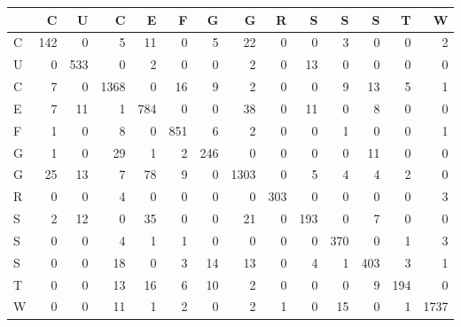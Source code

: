 \begin{tabular}{lrrrrrrrrrrrrr}
\toprule
{} &    C &    U &     C &    E &    F &    G &     G &    R &    S &    S &    S &    T &     W \\
\midrule
C &  142 &    0 &     5 &   11 &    0 &    5 &    22 &    0 &    0 &    3 &    0 &    0 &     2 \\
U &    0 &  533 &     0 &    2 &    0 &    0 &     2 &    0 &   13 &    0 &    0 &    0 &     0 \\
C &    7 &    0 &  1368 &    0 &   16 &    9 &     2 &    0 &    0 &    9 &   13 &    5 &     1 \\
E &    7 &   11 &     1 &  784 &    0 &    0 &    38 &    0 &   11 &    0 &    8 &    0 &     0 \\
F &    1 &    0 &     8 &    0 &  851 &    6 &     2 &    0 &    0 &    1 &    0 &    0 &     1 \\
G &    1 &    0 &    29 &    1 &    2 &  246 &     0 &    0 &    0 &    0 &   11 &    0 &     0 \\
G &   25 &   13 &     7 &   78 &    9 &    0 &  1303 &    0 &    5 &    4 &    4 &    2 &     0 \\
R &    0 &    0 &     4 &    0 &    0 &    0 &     0 &  303 &    0 &    0 &    0 &    0 &     3 \\
S &    2 &   12 &     0 &   35 &    0 &    0 &    21 &    0 &  193 &    0 &    7 &    0 &     0 \\
S &    0 &    0 &     4 &    1 &    1 &    0 &     0 &    0 &    0 &  370 &    0 &    1 &     3 \\
S &    0 &    0 &    18 &    0 &    3 &   14 &    13 &    0 &    4 &    1 &  403 &    3 &     1 \\
T &    0 &    0 &    13 &   16 &    6 &   10 &     2 &    0 &    0 &    0 &    9 &  194 &     0 \\
W &    0 &    0 &    11 &    1 &    2 &    0 &     2 &    1 &    0 &   15 &    0 &    1 &  1737 \\
\bottomrule
\end{tabular}
